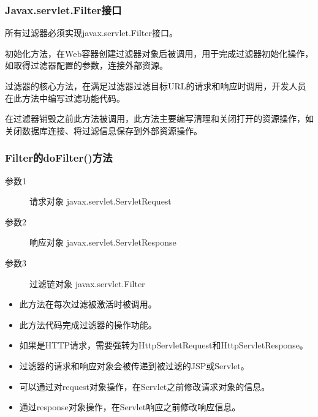 \begin{frame}[fragile] %
\frametitle{Javax.servlet.Filter接口} 

所有过滤器必须实现javax.servlet.Filter接口。


初始化方法，在Web容器创建过滤器对象后被调用，用于完成过滤器初始化操作，如取得过滤器配置的参数，连接外部资源。


过滤器的核心方法，在满足过滤器过滤目标URL的请求和响应时调用，开发人员在此方法中编写过滤功能代码。


在过滤器销毁之前此方法被调用，此方法主要编写清理和关闭打开的资源操作，如关闭数据库连接、将过滤信息保存到外部资源操作。
\end{frame}

\begin{frame}[fragile] %
\frametitle{Filter的doFilter()方法} 

\begin{description}
\item[参数1] 请求对象 javax.servlet.ServletRequest
\item[参数2] 响应对象 javax.servlet.ServletResponse
\item[参数3] 过滤链对象 javax.servlet.Filter
\end{description}

\begin{itemize}
\item 此方法在每次过滤被激活时被调用。
\item 此方法代码完成过滤器的操作功能。
\item 如果是HTTP请求，需要强转为HttpServletRequest和HttpServletResponse。
\item 过滤器的请求和响应对象会被传递到被过滤的JSP或Servlet。
\item 可以通过对request对象操作，在Servlet之前修改请求对象的信息。
\item 通过response对象操作，在Servlet响应之前修改响应信息。
\end{itemize}
\end{frame}




